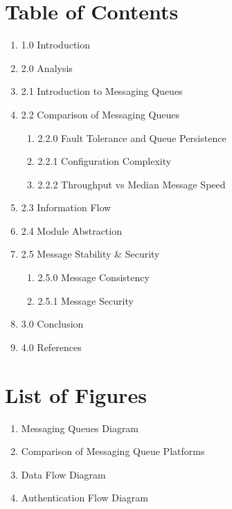 \documentclass[12pt]{report}
\begin{document}
\section*{Table of Contents}
\normalsize
\begin{enumerate}[label={},leftmargin=*,labelsep=2ex]
    \item 1.0 Introduction 
    \item 2.0 Analysis 
    \item 2.1 Introduction to Messaging Queues 
    \item 2.2 Comparison of Messaging Queues 
      \begin{enumerate}[label*={},leftmargin=*,labelsep=2ex]
        \item 2.2.0 Fault Tolerance and Queue Persistence 
        \item 2.2.1 Configuration Complexity 
        \item 2.2.2 Throughput vs Median Message Speed 
      \end{enumerate}
    \item 2.3 Information Flow 
    \item 2.4 Module Abstraction 
    \item 2.5 Message Stability \& Security 
    \begin{enumerate}[label*={},leftmargin=*,labelsep=2ex]
        \item 2.5.0 Message Consistency 
        \item 2.5.1 Message Security 
      \end{enumerate}
    \item 3.0 Conclusion 
    \item 4.0 References 
\end{enumerate}

\newpage\thispagestyle{fancy}\sectionfont{\scshape}
\section*{List of Figures}
\normalsize{}
\begin{enumerate}[label=\arabic*,leftmargin=*,labelsep=2ex,ref=\arabic*]
    \item Messaging Queues Diagram 
    \item Comparison of Messaging Queue Platforms 
    \item Data Flow Diagram 
    \item Authentication Flow Diagram 
\end{enumerate}
\end{document}
